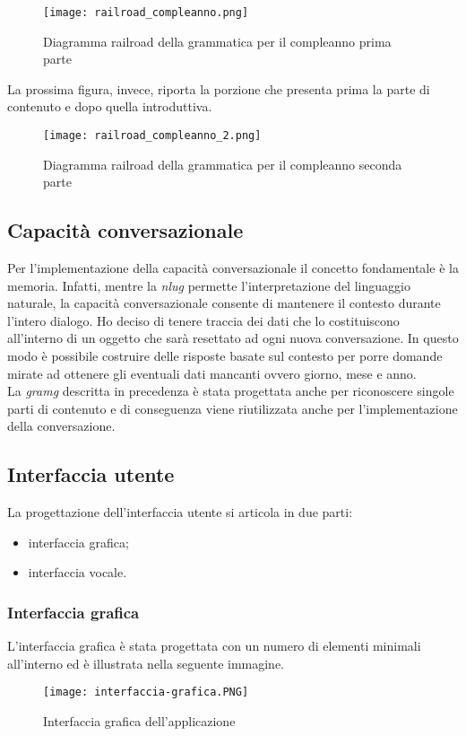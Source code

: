 	\begin{figure}[htbp]
		\begin{center}
			\texttt{[image: railroad\_compleanno.png]}
			\caption{Diagramma railroad della grammatica per il compleanno prima parte}
		\end{center}
	\end{figure}

	La prossima figura, invece, riporta la porzione che presenta prima la parte di contenuto e dopo quella introduttiva.
	\begin{figure}[htbp]
		\begin{center}
			\texttt{[image: railroad\_compleanno\_2.png]}
			\caption{Diagramma railroad della grammatica per il compleanno seconda parte}
		\end{center}
	\end{figure}

	\subsection{Capacità conversazionale}
	Per l'implementazione della capacità conversazionale il concetto fondamentale è la memoria. Infatti, mentre la \emph{\gls{nlug}} permette l'interpretazione del linguaggio naturale, la capacità conversazionale consente di mantenere il contesto durante l'intero dialogo. Ho deciso di tenere traccia dei dati che lo costituiscono all'interno di un oggetto che sarà resettato ad ogni nuova conversazione. In questo modo è possibile costruire delle risposte basate sul contesto per porre domande mirate ad ottenere gli eventuali dati mancanti ovvero giorno, mese e anno. \\
	La \emph{\gls{gramg}} descritta in precedenza è stata progettata anche per riconoscere singole parti di contenuto e di conseguenza viene riutilizzata anche per l'implementazione della conversazione. 
	\subsection{Interfaccia utente}
	La progettazione dell'interfaccia utente si articola in due parti:
	\begin{itemize}
		\item interfaccia grafica;
		\item interfaccia vocale.
	\end{itemize}
		\subsubsection{Interfaccia grafica}
		L'interfaccia grafica è stata progettata con un numero di elementi minimali all'interno ed è illustrata nella seguente immagine.
		\begin{figure}[htbp]
			\begin{center}
				\texttt{[image: interfaccia-grafica.PNG]}
				\caption{Interfaccia grafica dell'applicazione}
			\end{center}
		\end{figure}
	
